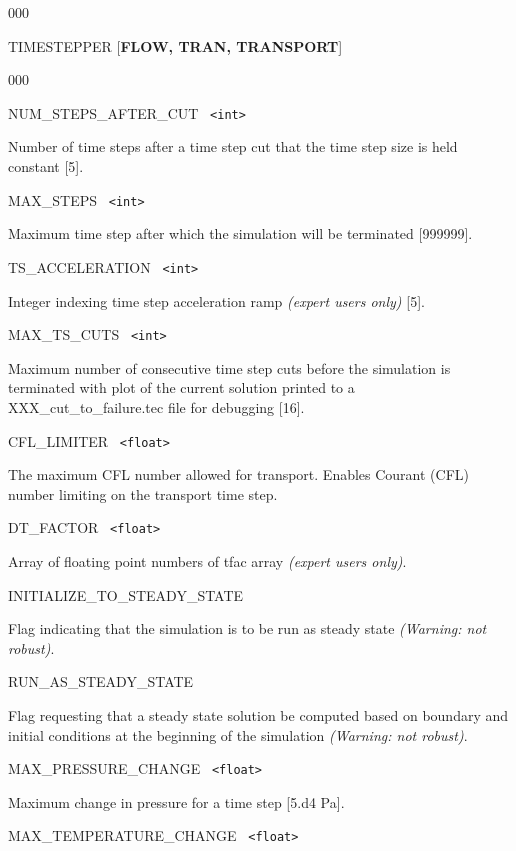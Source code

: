 \begin{deflist}{000}
\item[TIMESTEPPER] [{\bf FLOW, TRAN, TRANSPORT}]
\begin{deflist}{000}
\item[NUM\_STEPS\_AFTER\_CUT] \ {\tt <int>} 

Number of time steps after a time step cut that the time step size is held constant [5].

\item[MAX\_STEPS] \ {\tt <int>} 

Maximum time step after which the simulation will be terminated [999999].

\item[TS\_ACCELERATION] \ {\tt <int>} 

Integer indexing time step acceleration ramp {\em (expert users only)} [5].

\item[MAX\_TS\_CUTS] \ {\tt <int>} 

Maximum number of consecutive time step cuts before the simulation is terminated with plot of the current solution printed to a XXX\_cut\_to\_failure.tec file for debugging [16].

\item[CFL\_LIMITER] \ {\tt <float>}

The maximum CFL number allowed for transport. Enables Courant (CFL) number limiting on the transport time step.

\item[DT\_FACTOR] \ {\tt <float>} 

Array of floating point numbers of tfac array {\em (expert users only)}.

\item[INITIALIZE\_TO\_STEADY\_STATE] ~

Flag indicating that the simulation is to be run as steady state {\em (Warning: not robust)}.

\item[RUN\_AS\_STEADY\_STATE] ~

Flag requesting that a steady state solution be computed based on boundary and initial conditions at the beginning of the simulation {\em (Warning: not robust)}.

\item[MAX\_PRESSURE\_CHANGE] \ {\tt <float>} 

Maximum change in pressure for a time step [5.d4 Pa].

\item[MAX\_TEMPERATURE\_CHANGE] \ {\tt <float>} 


\end{deflist}
\end{deflist}
